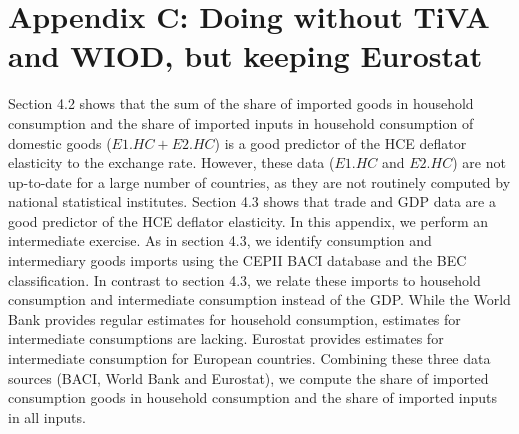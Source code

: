 \documentclass[11pt,a4paper]{article} %
\begin{document}
\section*{Appendix C: Doing without TiVA and WIOD, but keeping Eurostat}  %
Section 4.2 shows that the sum of the share of imported goods in household consumption and the share of imported inputs in household consumption of domestic goods ($E1.HC + E2.HC$) is a good predictor of the HCE deflator elasticity to the exchange rate. 
However, these data ($E1.HC$ and $E2.HC$) are not up-to-date for a large number of countries, as they are not routinely computed by national statistical institutes. 
Section 4.3 shows that trade and GDP data are a good predictor of the HCE deflator elasticity.
In this appendix, we perform an intermediate exercise.
As in section 4.3, we identify consumption and intermediary goods imports using the CEPII BACI database and the BEC classification.
In contrast to section 4.3, we relate these imports to household consumption and intermediate consumption instead of the GDP.
While the World Bank provides regular estimates for household consumption, estimates for intermediate consumptions are lacking. 
Eurostat provides estimates for intermediate consumption for European countries.
Combining these three data sources (BACI, World Bank and Eurostat), we compute the share of imported consumption goods in household consumption and the share of imported inputs in all inputs. 
%
%
\end{document}
